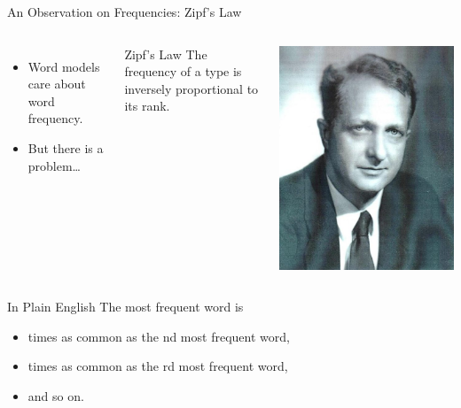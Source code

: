 \documentclass[professionalfonts, xcolor={usenames,svgnames,x11names,table}]{beamer}
\begin{document}
\unnumbered{

\begin{frame}[plain]
%
\centering
%
\huge{{\color{SkyBlue3!80!black}{Appendix}}}
%
\end{frame}
}

\begin{frame}{An Observation on Frequencies: Zipf's Law}
    \begin{columns}
        \begin{itemize}
            \item Word models care about word frequency.
            \item But there is a problem\ldots
        \end{itemize}
        \begin{alertblock}{Zipf's Law}
            The frequency of a type is inversely proportional to its rank.
        \end{alertblock}

        \includegraphics[width=.8\linewidth]{./img/george_zipf}
    \end{columns}

    \pause
    \begin{block}{In Plain English}
        The most frequent word is
            \begin{itemize}
                \item {} times as common as the nd most frequent word,
                \item {} times as common as the rd most frequent word,
                \item and so on.
            \end{itemize}
    \end{block}
\end{frame}
\end{document}
